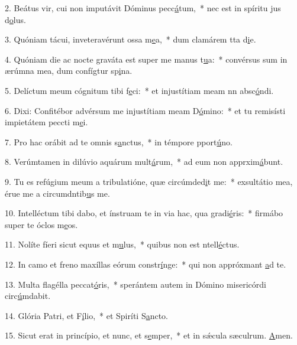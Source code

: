 2. Beátus vir, cui non imputávit Dóminus pecc\uline{á}tum,~* nec est in spíritu jus d\uline{o}lus.\par 
3. Quóniam tácui, inveteravérunt ossa m\uline{e}a,~* dum clamárem tta d\uline{i}e.\par 
4. Quóniam die ac nocte graváta est super me manus t\uline{u}a:~* convérsus sum in ærúmna mea, dum confígtur sp\uline{i}na.\par 
5. Delíctum meum cógnitum tibi f\uline{e}ci:~* et injustítiam meam nn absc\uline{ó}ndi.\par 
6. Dixi: Confitébor advérsum me injustítiam meam D\uline{ó}mino:~* et tu remisísti impietátem peccti m\uline{e}i.\par 
7. Pro hac orábit ad te omnis s\uline{a}nctus,~* in témpore pport\uline{ú}no.\par 
8. Verúmtamen in dilúvio aquárum mult\uline{á}rum,~* ad eum non apprxim\uline{á}bunt.\par 
9. Tu es refúgium meum a tribulatióne, quæ circúmded\uline{i}t me:~* exsultátio mea, érue me a circumdntib\uline{u}s me.\par 
10. Intelléctum tibi dabo, et ínstruam te in via hac, qua gradi\uline{é}ris:~* firmábo super te óclos m\uline{e}os.\par 
11. Nolíte fíeri sicut equus et m\uline{u}lus,~* quibus non est ntell\uline{é}ctus.\par 
12. In camo et freno maxíllas eórum constr\uline{í}nge:~* qui non appróxmant \uline{a}d te.\par 
13. Multa flagélla peccat\uline{ó}ris,~* sperántem autem in Dómino misericórdi circ\uline{ú}mdabit.\par 
14. Glória Patri, et F\uline{í}lio,~* et Spiríti S\uline{a}ncto.\par 
15. Sicut erat in princípio, et nunc, et s\uline{e}mper,~* et in sǽcula sæculrum. \uline{A}men.\par 

